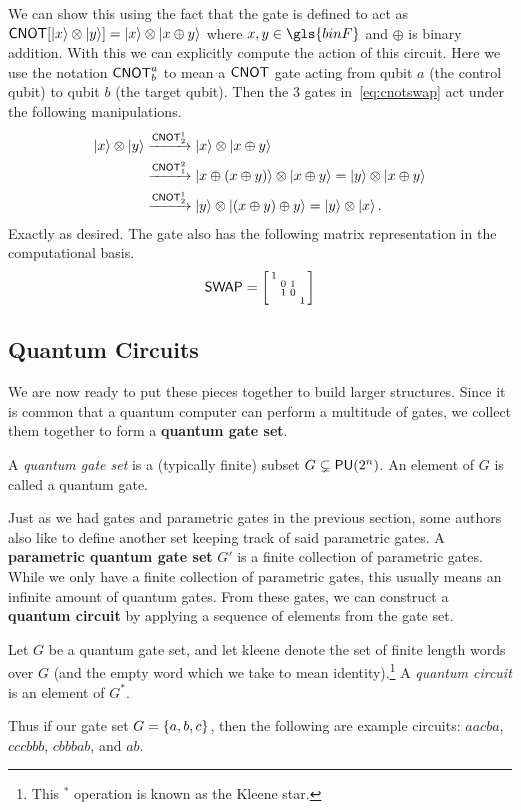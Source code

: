 \begin{example}
    We can show this using the fact that the \CNOT{} gate is defined to act as $\mathsf{CNOT}\qty[\ket{x}\otimes\ket{y}] = \ket{x} \otimes \ket{x\oplus y}$ where $x, y \in \gls{binF}$ and $\oplus$ is binary addition.
    With this we can explicitly compute the action of this circuit.
    Here we use the notation $\mathsf{CNOT}^a_b$ to mean a $\mathsf{CNOT}{}$ gate acting from qubit $a$ (the control qubit) to qubit $b$ (the target qubit).
    Then the 3 \CNOT{} gates in~\cref{eq:cnotswap} act under the following manipulations.
    \begin{align*}
        \ket{x}\otimes\ket{y} & \xrightarrow{\mathsf{CNOT}^1_2} \ket{x}\otimes\ket{x\oplus y}                                                     \\
                              & \xrightarrow{\mathsf{CNOT}^2_1} \ket{x\oplus (x\oplus y)}\otimes \ket{x\oplus y}  = \ket{y}\otimes\ket{x\oplus y} \\
                              & \xrightarrow{\mathsf{CNOT}^1_2} \ket{y}\otimes\ket{(x\oplus y)\oplus y} = \ket{y}\otimes \ket{x}.
    \end{align*}
    Exactly as desired.
    The \SWAP{} gate also has the following matrix representation in the computational basis.
    \begin{equation}
        \SWAP = \smqty[1 & & & \\ & 0 & 1 & \\ & 1 & 0 & \\ & & & 1]
    \end{equation}
\end{example}

\subsection{Quantum Circuits}

We are now ready to put these pieces together to build larger structures.
Since it is common that a quantum computer can perform a multitude of gates, we collect them together to form a \textbf{quantum gate set}.
\begin{definition}
    A \emph{quantum gate set} is a (typically finite) subset $G \subsetneq \mathsf{PU} (2^n)$. An element of $G$ is called a quantum gate.
\end{definition}
Just as we had gates and parametric gates in the previous section, some authors also like to define another set keeping track of said parametric gates.
A \textbf{parametric quantum gate set} $G'$ is a finite collection of parametric gates.
While we only have a finite collection of parametric gates, this usually means an infinite amount of quantum gates.
From these gates, we can construct a \textbf{quantum circuit} by applying a sequence of elements from the gate set.
\begin{definition}\label{def:circuit}
    Let $G$ be a quantum gate set, and let \gls{kleene} denote the set of finite length words over $G$ (and the empty word which we take to mean identity).\footnote{This $^*$ operation is known as the Kleene star.}
    A \emph{quantum circuit} is an element of $G^*$.
\end{definition}
Thus if our gate set $G = \qty{a, b, c}$, then the following are example circuits: $aacba$, $cccbbb$, $cbbbab$, and $ab$.

